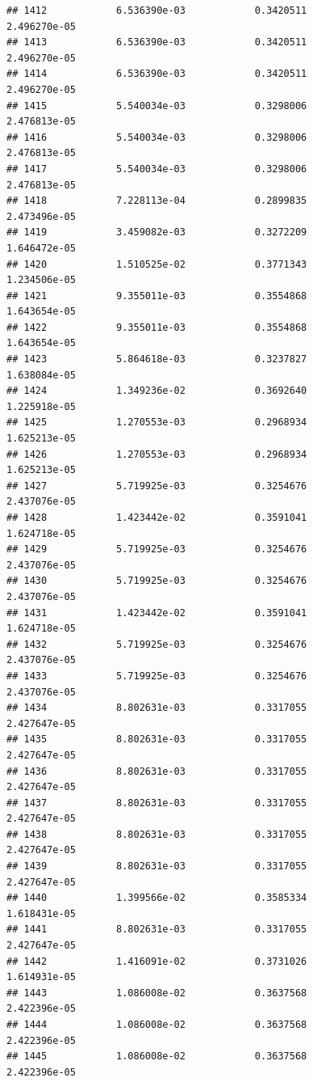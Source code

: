 \documentclass[
]{article}
\begin{document}
\begin{verbatim}
## 1412            6.536390e-03            0.3420511            2.496270e-05
## 1413            6.536390e-03            0.3420511            2.496270e-05
## 1414            6.536390e-03            0.3420511            2.496270e-05
## 1415            5.540034e-03            0.3298006            2.476813e-05
## 1416            5.540034e-03            0.3298006            2.476813e-05
## 1417            5.540034e-03            0.3298006            2.476813e-05
## 1418            7.228113e-04            0.2899835            2.473496e-05
## 1419            3.459082e-03            0.3272209            1.646472e-05
## 1420            1.510525e-02            0.3771343            1.234506e-05
## 1421            9.355011e-03            0.3554868            1.643654e-05
## 1422            9.355011e-03            0.3554868            1.643654e-05
## 1423            5.864618e-03            0.3237827            1.638084e-05
## 1424            1.349236e-02            0.3692640            1.225918e-05
## 1425            1.270553e-03            0.2968934            1.625213e-05
## 1426            1.270553e-03            0.2968934            1.625213e-05
## 1427            5.719925e-03            0.3254676            2.437076e-05
## 1428            1.423442e-02            0.3591041            1.624718e-05
## 1429            5.719925e-03            0.3254676            2.437076e-05
## 1430            5.719925e-03            0.3254676            2.437076e-05
## 1431            1.423442e-02            0.3591041            1.624718e-05
## 1432            5.719925e-03            0.3254676            2.437076e-05
## 1433            5.719925e-03            0.3254676            2.437076e-05
## 1434            8.802631e-03            0.3317055            2.427647e-05
## 1435            8.802631e-03            0.3317055            2.427647e-05
## 1436            8.802631e-03            0.3317055            2.427647e-05
## 1437            8.802631e-03            0.3317055            2.427647e-05
## 1438            8.802631e-03            0.3317055            2.427647e-05
## 1439            8.802631e-03            0.3317055            2.427647e-05
## 1440            1.399566e-02            0.3585334            1.618431e-05
## 1441            8.802631e-03            0.3317055            2.427647e-05
## 1442            1.416091e-02            0.3731026            1.614931e-05
## 1443            1.086008e-02            0.3637568            2.422396e-05
## 1444            1.086008e-02            0.3637568            2.422396e-05
## 1445            1.086008e-02            0.3637568            2.422396e-05

\end{verbatim}
\end{document}
